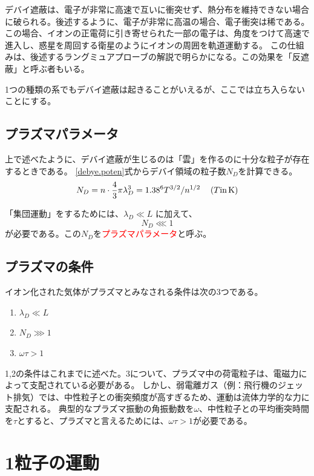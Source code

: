 \documentclass{ltjsarticle}
\numberwithin{equation}{section} %
\begin{document}
デバイ遮蔽は、電子が非常に高速で互いに衝突せず、熱分布を維持できない場合に破られる。後述するように、電子が非常に高温の場合、電子衝突は稀である。この場合、イオンの正電荷に引き寄せられた一部の電子は、角度をつけて高速で進入し、惑星を周回する衛星のようにイオンの周囲を軌道運動する。
この仕組みは、後述するラングミュアプローブの解説で明らかになる。この効果を「反遮蔽」と呼ぶ者もいる。

1つの種類の系でもデバイ遮蔽は起きることがいえるが、ここでは立ち入らないことにする。

\subsection{プラズマパラメータ}
上で述べたように、デバイ遮蔽が生じるのは「雲」を作るのに十分な粒子が存在するときである。
\eqref{debye.poten}式からデバイ領域の粒子数$N_D$を計算できる。
\begin{equation}
  N_D = n\cdot \frac{4}{3}\pi \lambda_D ^3 = 1.38 \time 10^6T^{3/2}/n^{1/2} \hspace{1pc}(T\text{in}\, \si{\kelvin})
\end{equation}

「集団運動」をするためには、$\lambda_D \ll L$ に加えて、
\begin{equation}
  N_D \lll 1
\end{equation}
が必要である。この$N_D$を\textcolor{red}{プラズマパラメータ}と呼ぶ。

\subsection{プラズマの条件}
イオン化された気体がプラズマとみなされる条件は次の3つである。
\begin{enumerate}
  \item $\lambda_D \ll L$
  \item $N_D \ggg 1$
  \item $\omega \tau > 1$
\end{enumerate}
1,2の条件はこれまでに述べた。3について、プラズマ中の荷電粒子は、電磁力によって支配されている必要がある。
しかし、弱電離ガス（例：飛行機のジェット排気）では、中性粒子との衝突頻度が高すぎるため、運動は流体力学的な力に支配される。
典型的なプラズマ振動の角振動数を$\omega$、中性粒子との平均衝突時間を$\tau$とすると、プラズマと言えるためには、$\omega \tau > 1$が必要である。

\section{1粒子の運動}
\end{document}
